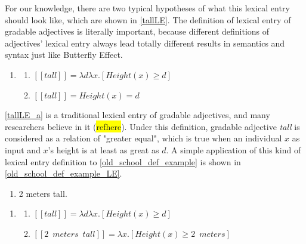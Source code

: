 \documentclass{ctexart}
\begin{document}
For our knowledge, there are two typical hypotheses of what this lexical entry should look like, which are shown in \ref{tallLE}. The definition of lexical entry of gradable adjectives is literally important, because different definitions of adjectives' lexical entry always lead totally different results in semantics and syntax just like Butterfly Effect.

\begin{enumerate}[resume]
    \item \label{tallLE}
    
    \begin{enumerate}[ref=(\arabic{enumi}\alph*)]
        \item \label{tallLE_a} 
        $[\![tall]\!]=\lambda d \lambda x.[Height(x) \geq d]$
    
        \item \label{tallLE_b} 
        $[\![tall]\!]=Height(x)=d$
    
    \end{enumerate}
\end{enumerate}

\ref{tallLE_a} is a traditional lexical entry of gradable adjectives, and many researchers believe in it (\colorbox{yellow}{refhere}). Under this definition, gradable adjective \textit{tall} is considered as a relation of "greater equal", which is true when an individual $x$ as input and $x$'s height is at least as great as $d$. A simple application of this kind of lexical entry definition to \ref{old_school_def_example} is shown in \ref{old_school_def_example_LE}.

\begin{enumerate}[resume]

    \item \label{old_school_def_example} 2 meters tall.

\end{enumerate}

\begin{enumerate}[resume]

    \item \label{old_school_def_example_LE}
    
    \begin{enumerate}[ref=(\arabic{enumi}\alph*)]
        
        \item $[\![tall]\!]=\lambda d \lambda x.[Height(x) \geq d]$
        \item $[\![2 \enspace meters \enspace tall]\!]=\lambda x.[Height(x) \geq 2 \enspace meters]$

    \end{enumerate}

\end{enumerate}
\end{document}
